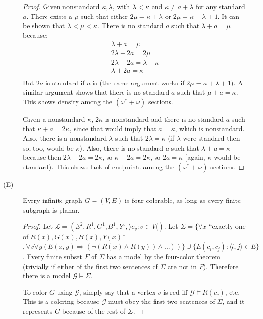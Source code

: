 \documentclass[12pt]{article}
\begin{document}
\begin{description}
\begin{proof}
	Given nonstandard $\kappa,\lambda$, with $\lambda < \kappa$ and
	$\kappa \ne a+\lambda$ for any standard $a$.  There exists a $\mu$
	such that either $2\mu = \kappa + \lambda$ or $2\mu = \kappa +
	\lambda + 1$.  It can be shown that $\lambda < \mu < \kappa$.  There
	is no standard $a$ such that $\lambda + a = \mu$ because:
	\begin{gather*}
	  \lambda + a = \mu \\
	  2\lambda + 2a = 2\mu \\
	  2\lambda + 2a = \lambda + \kappa \\
	  \lambda + 2a = \kappa \\
	\end{gather*}
	But $2a$ is standard if $a$ is (the same argument works if $2\mu =
	\kappa + \lambda + 1$).  A similar argument shows that there is no
	standard $a$ such that $\mu + a = \kappa$.  This shows density among
	the $(\omega^* + \omega)$ sections.

	Given a nonstandard $\kappa$, $2\kappa$ is nonstandard and there is
	no standard $a$ such that $\kappa + a = 2\kappa$, since that would
	imply that $a = \kappa$, which is nonstandard.  Also, there is a
	nonstandard $\lambda$ such that $2\lambda = \kappa$ (if $\lambda$
	were standard then so, too, would be $\kappa$).  Also, there is no
	standard $a$ such that $\lambda + a = \kappa$ because then $2\lambda
	+ 2a = 2\kappa$, so $\kappa + 2a = 2\kappa$, so $2a = \kappa$
	(again, $\kappa$ would be standard).  This shows lack of endpoints
	among the $(\omega^* + \omega)$ sections.
  \end{proof}

\item[(E)] Every infinite graph $G = (V,E)$ is four-colorable, as long
as every finite subgraph is planar.
  \begin{proof}
	Let $\mathcal{L} = (E^2, R^1, G^1, B^1, Y^1, \rangle c_v : v \in V
	\langle)$.  Let $\Sigma = \{ \forall x $ ``exactly one of
	$R(x),G(x),B(x),Y(x)$'' $, \forall x \forall y (E(x,y) \Rightarrow
	(\neg (R(x) \wedge R(y)) \wedge ...)) \} \cup \{ E(c_i, c_j) : 
	\langle i,j \rangle \in E \}$.  Every finite subset $F$ of $\Sigma$
	has a model by the four-color theorem (trivially if either of the
	first two sentences of $\Sigma$ are not in $F$).  Therefore there is
	a model $\mathcal{G} \models \Sigma$.

	To color $G$ using $\mathcal{G}$, simply say that a vertex $v$ is
	red iff $\mathcal{G} \models R(c_v)$, etc. This is a coloring because
	$\mathcal{G}$ must obey the first two sentences of $\Sigma$, and it
	represents $G$ because of the rest of $\Sigma$.
  \end{proof}
\end{description}
\end{document}
